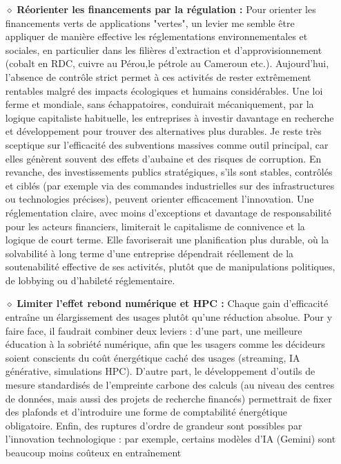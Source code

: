 \documentclass[11pt,a4paper]{article}
\begin{document}
  \begin{itemize}
    \item[$\diamond$]\textbf{Réorienter les financements par la régulation :} 
    Pour orienter les financements verts de applications "vertes", un levier me semble être appliquer de manière effective les réglementations environnementales et sociales, 
    en particulier dans les filières d’extraction et d’approvisionnement (cobalt en RDC, cuivre au Pérou,le pétrole au Cameroun etc.). 
    Aujourd’hui, l’absence de contrôle strict permet à ces activités de rester extrêmement rentables malgré des impacts 
    écologiques et humains considérables. Une loi ferme et mondiale, sans échappatoires, conduirait mécaniquement, par la logique 
    capitaliste habituelle, les entreprises à investir davantage en recherche et développement pour trouver des alternatives plus durables. 
    Je reste très sceptique sur l’efficacité des subventions massives comme outil principal, car elles génèrent souvent des effets d’aubaine 
    et des risques de corruption. En revanche, des investissements publics stratégiques, s’ils sont stables, contrôlés et ciblés 
    (par exemple via des commandes industrielles sur des infrastructures ou technologies précises), peuvent orienter efficacement l’innovation. 
    Une réglementation claire, avec moins d’exceptions et davantage de responsabilité pour les acteurs financiers, 
    limiterait le capitalisme de connivence et la logique de court terme. Elle favoriserait une planification plus durable, où la solvabilité 
    à long terme d’une entreprise dépendrait réellement de la soutenabilité effective de ses activités, plutôt que de manipulations politiques, 
    de lobbying ou d’habileté réglementaire.
    \item[$\diamond$]\textbf{Limiter l’effet rebond numérique et HPC :} 
    Chaque gain d’efficacité entraîne un élargissement des usages 
    plutôt qu’une réduction absolue. Pour y faire face, il faudrait combiner deux leviers : d’une part, une meilleure éducation 
    à la sobriété numérique, afin que les usagers comme les décideurs soient conscients du coût énergétique caché des usages 
    (streaming, IA générative, simulations HPC). D’autre part, le développement d’outils de mesure standardisés de l’empreinte carbone 
    des calculs (au niveau des centres de données, mais aussi des projets de recherche financés) permettrait de fixer des plafonds 
    et d’introduire une forme de comptabilité énergétique obligatoire. Enfin, des ruptures d’ordre de grandeur sont possibles 
    par l’innovation technologique : par exemple, certains modèles d’IA (Gemini) sont beaucoup moins coûteux en entraînement 

\end{itemize}
\end{document}
